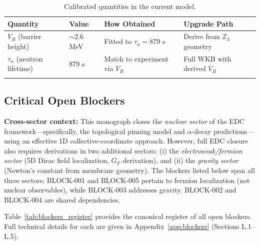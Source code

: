 \documentclass[11pt,a4paper]{article}
\begin{document}
\begin{longtable}{p{3cm}p{3cm}p{5cm}p{3cm}}
\toprule
\textbf{Quantity} & \textbf{Value} & \textbf{How Obtained} & \textbf{Upgrade Path} \\
\midrule
\endhead
$V_B$ (barrier height) & $\sim 2.6$ MeV & Fitted to $\tau_n = 879$ s & Derive from $\mathbb{Z}_3$ geometry \\
$\tau_n$ (neutron lifetime) & 879 s & Match to experiment via $V_B$ & Full WKB with derived $V_B$ \\
\bottomrule
\caption{Calibrated quantities in the current model.}
\label{tab:calibrations}
\end{longtable}

\subsection{Critical Open Blockers}
\label{sec:blockers}

\textbf{Cross-sector context:} This monograph closes the \emph{nuclear sector} of the EDC framework---specifically, the topological pinning model and $\alpha$-decay predictions---using an effective 1D collective-coordinate approach. However, full EDC closure also requires derivations in two additional sectors: (i) the \emph{electroweak/fermion sector} (5D Dirac field localization, $G_F$ derivation), and (ii) the \emph{gravity sector} (Newton's constant from membrane geometry). The blockers listed below span all three sectors; BLOCK-001 and BLOCK-005 pertain to fermion localization (not nuclear observables), while BLOCK-003 addresses gravity. BLOCK-002 and BLOCK-004 are shared dependencies.

\vspace{0.5em}
Table~\ref{tab:blockers_register} provides the canonical register of all open blockers. Full technical details for each are given in Appendix~\ref{app:blockers} (Sections L.1--L.5).
\end{document}
